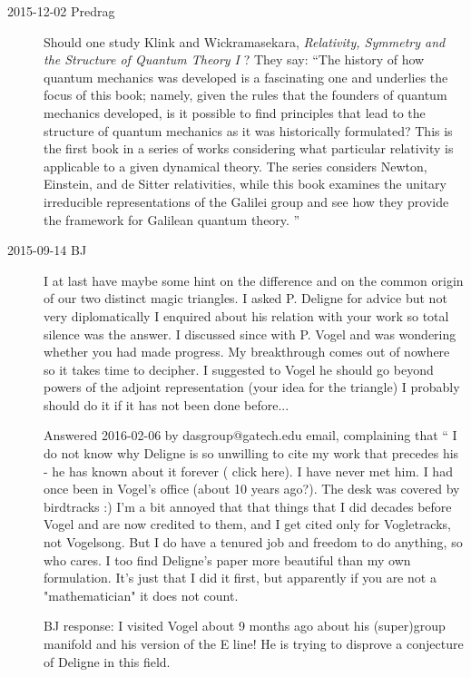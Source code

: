 \begin{description}
\item[2015-12-02  Predrag]
Should one study
Klink and Wickramasekara,
{\em Relativity, Symmetry and the Structure of Quantum Theory I} ?
They say: ``The history of how quantum mechanics was developed is a
fascinating one and underlies the focus of this book; namely, given the
rules that the founders of quantum mechanics developed, is it possible to
find principles that lead to the structure of quantum mechanics as it was
historically formulated? This is the first book in a series of works
considering what particular relativity is applicable to a given dynamical
theory. The series considers Newton, Einstein, and de Sitter
relativities, while this book examines the unitary irreducible
representations of the Galilei group and see how they provide the
framework for Galilean quantum theory.
''

\item[2015-09-14 BJ]
I at last have maybe some hint on the difference and on the common origin
of our two distinct magic triangles. I asked P. Deligne for advice but not
very diplomatically I enquired about his relation with your work so total
silence was the answer.
I discussed since with P. Vogel and was wondering whether you had made
progress. My breakthrough comes out of nowhere so it takes time to
decipher.
I suggested to Vogel he should go beyond powers of the adjoint
representation (your idea for the triangle) I probably should do it if it
has not been done before...

Answered 2016-02-06 by dasgroup@gatech.edu email,
complaining that `` I do not know why Deligne is so unwilling to cite my
work that precedes his - he has known about it forever
( {click here}). I
have never met him. I had once been in Vogel's office (about 10 years
ago?). The desk was covered by birdtracks :) I'm a bit annoyed that that
things that I did decades before Vogel and are now credited to them, and
I get cited only for Vogletracks, not Vogelsong. But I do have a tenured
job and freedom to do anything, so who cares. I too find Deligne's paper
more beautiful than my own formulation. It's just that I did it first,
but apparently if you are not a "mathematician" it does not count.

BJ response:
I visited Vogel about 9 months ago about his (super)group manifold and
his version of the E line! He is trying to disprove a conjecture of
Deligne in this field.


\end{description}
